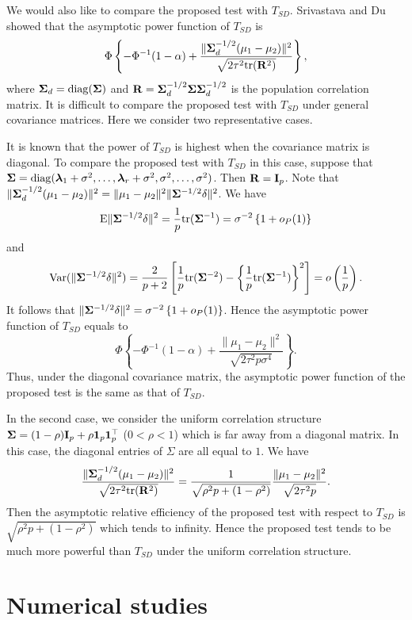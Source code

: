 \documentclass[times,sort&compress,3p]{elsarticle}
\newcommand{\mytr}{ {\rm tr} }
\newcommand{\mydiag}{ {\rm diag} }
\newcommand{\myE}{ {\rm E} }
\newcommand{\myVar}{ {\rm Var} }
\newcommand{\bfsym}[1]{\ensuremath{\boldsymbol{#1}}}
\def\blambda {\bfsym {\lambda}}        \def\bLambda {\bfsym {\Lambda}}
\theoremstyle{plain}
\theoremstyle{definition}
\theoremstyle{remark}
\begin{document}
 We would also like to compare the proposed test with $T_{SD}$. Srivastava and Du~\cite{Srivastava2008A} showed that the asymptotic power function of $T_{SD}$ is
 $$
 \Phi\left\{-\Phi^{-1}(1-\alpha)+\frac{\|\bSigma_d^{-1/2}(\mu_1-\mu_2)\|^2}{\sqrt{2\tau^2\mytr(\BR^2)}}\right\},
 $$
 where $\bSigma_d=\mydiag(\bSigma)$ and $\BR=\bSigma_d^{-1/2} \bSigma \bSigma_d^{-1/2}$ is the population correlation matrix.
 It is difficult to compare the proposed test with $T_{SD}$ under general covariance matrices.
 Here we consider two representative cases.


 It is known that the power of $T_{SD}$ is highest when the covariance matrix is diagonal.
 To compare the proposed test with $T_{SD}$ in this case,
suppose that $\bSigma=\mydiag(\blambda_1+\sigma^2,\ldots,\blambda_r+\sigma^2,\sigma^2,\ldots,\sigma^2)$. Then $\mathbf{R}=\mathbf{I}_p$.
 Note that $\|\bSigma_d^{-1/2}(\mu_1-\mu_2)\|^2=\|\mu_1-\mu_2\|^2 \|\bSigma^{-1/2}\delta\|^2$.
 We have 
 $$\myE\|\bSigma^{-1/2}\delta\|^2=
 \frac{1}{p}\mytr(\bSigma^{-1})
 =\sigma^{-2} \left\{1+o_P(1)\right\}
 $$
and
 $$
 \myVar( \|\bSigma^{-1/2}\delta\|^2 )=\frac{2}{p+2}\left[\frac{1}{p}\mytr(\bSigma^{-2})-\left\{\frac{1}{p}\mytr(\bSigma^{-1})\right\}^2\right]=o\left(\frac{1}{p}\right).$$
 It follows that $\|\bSigma^{-1/2}\delta\|^2=\sigma^{-2}\left\{ 1+o_P(1)\right\}$. Hence the asymptotic power function of $T_{SD}$ equals to
 $$
 \Phi\left\{-\Phi^{-1}(1-\alpha)+\frac{\|\mu_1-\mu_2\|^2}{\sqrt{2\tau^2 p\sigma^4}}\right\}.
 $$
 Thus, under the diagonal covariance matrix, the asymptotic power function of the proposed test is the same as that of $T_{SD}$.

In the second case, we consider the uniform correlation structure $\bSigma=(1-\rho)\BI_p+\rho \mathbf{1}_p\mathbf{1}_p^\top $ ($0<\rho <1$) which is far away from a diagonal matrix.
 In this case, the diagonal entries of $\Sigma$ are all equal to $1$. 
 We have
 $$
 \frac{\|\bSigma_d^{-1/2}(\mu_1-\mu_2)\|^2}{\sqrt{2\tau^2\mytr(\BR^2)}}
 =
 \frac{1}{\sqrt{\rho^2 p +(1-\rho^2)}}\frac{\|\mu_1-\mu_2\|^2}{\sqrt{2\tau^2p}}.
 $$
 Then the asymptotic relative efficiency of the proposed test with respect to $T_{SD}$ is
 $\sqrt{\rho^2 p +(1-\rho^2)}$ which tends to infinity.
 Hence the proposed test tends to be much more powerful than $T_{SD}$ under the uniform correlation structure.






\section{Numerical studies}
\end{document}
